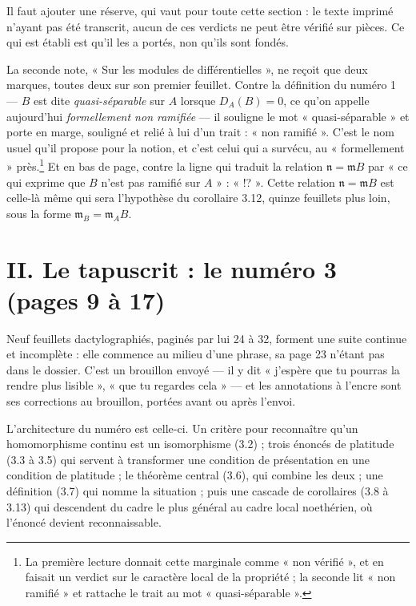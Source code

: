 \documentclass[11pt,a4paper]{article}
\begin{document}
Il faut ajouter une réserve, qui vaut pour toute cette section : le texte
imprimé n'ayant pas été transcrit, aucun de ces verdicts ne peut être vérifié
sur pièces. Ce qui est établi est qu'il les a portés, non qu'ils sont fondés.

La seconde note, « Sur les modules de différentielles », ne reçoit que deux
marques, toutes deux sur son premier feuillet. Contre la définition du numéro 1
— $B$ est dite \emph{quasi-séparable} sur $A$ lorsque $D_A(B) = 0$, ce qu'on
appelle aujourd'hui \emph{formellement non ramifiée} — il souligne le mot
« quasi-séparable » et porte en marge, souligné et relié à lui d'un trait :
« non ramifié ». C'est le nom usuel qu'il propose pour la notion, et c'est
celui qui a survécu, au « formellement » près.\footnote{La première lecture
donnait cette marginale comme « non vérifié », et en faisait un verdict sur le
caractère local de la propriété ; la seconde lit « non ramifié » et rattache le
trait au mot « quasi-séparable ».} Et en bas de page, contre la ligne qui
traduit la relation $\mathfrak{n} = \mathfrak{m}B$ par « ce qui exprime que $B$
n'est pas ramifié sur $A$ » : « !? ».
Cette relation $\mathfrak{n} = \mathfrak{m}B$ est celle-là même qui sera
l'hypothèse du corollaire 3.12, quinze feuillets plus loin, sous la forme
$\mathfrak{m}_B = \mathfrak{m}_A B$.

\section*{II. Le tapuscrit : le numéro 3 (pages 9 à 17)}

Neuf feuillets dactylographiés, paginés par lui 24 à 32, forment une suite
continue et incomplète : elle commence au milieu d'une phrase, sa page 23
n'étant pas dans le dossier. C'est un brouillon envoyé — il y dit « j'espère
que tu pourras la rendre plus lisible », « que tu regardes cela » — et les
annotations à l'encre sont ses corrections au brouillon, portées avant ou après
l'envoi.

L'architecture du numéro est celle-ci. Un critère pour reconnaître qu'un
homomorphisme continu est un isomorphisme (3.2) ; trois énoncés de platitude
(3.3 à 3.5) qui servent à transformer une condition de présentation en une
condition de platitude ; le théorème central (3.6), qui combine les deux ; une
définition (3.7) qui nomme la situation ; puis une cascade de corollaires
(3.8 à 3.13) qui descendent du cadre le plus général au cadre local
noethérien, où l'énoncé devient reconnaissable.
\end{document}
